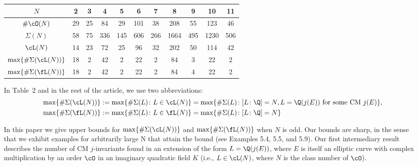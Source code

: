 	\begin{table}[!ht]
	\centering
	\begin{tabular}{c|cccccccccc}
	$N$ & 2 & 3 & 4 & 5 & 6 & 7 & 8 & 9 & 10 & 11 \\ \hline
	$\#\cO(N)$ & 29 & 25 & 84 & 29 & 101 & 38 & 208 & 55 & 123 & 46 \\ \hline
	$\Sigma(N)$ & 58 & 75 & 336 & 145 & 606 & 266 & 1664 & 495 & 1230 & 506 \\ \hline
	$\cL(N)$ & 14 & 23 & 72 & 25 & 96 & 32 & 202 & 50 & 114 & 42 \\ \hline
	$\max\{\#\Sigma(\cL(N))\}$ & 18 & 2 & 42 & 2 & 22 & 2 & 84 & 3 & 22 & 2 \\ \hline
	$\max\{\#\Sigma(\fL(N))\}$ & 18 & 2 & 42 & 2 & 22 & 2 & 84 & 4 & 22 & 2 
	\end{tabular}
	\end{table}


In Table~2 and in the rest of the article, we use two abbreviations:
	\[
	\begin{aligned}
	\max\{\#\Sigma(\cL(N))\}&:= \max\{\#\Sigma(L) \colon L \in \cL(N)\}= \max\{\#\Sigma(L) \colon [L \colon \Q]= N, L= \Q(j(E)) \text{ for some CM } j(E) \}, \\
	\max\{\#\Sigma(\fL(N))\}&:= \max\{\#\Sigma(L) \colon L \in \fL(N)\}= \max\{\#\Sigma(L) \colon [L \colon \Q]= N \}
	\end{aligned}
	\]


In this paper we give upper bounds for $\max\{\#\Sigma(\cL(N))\}$ and $\max\{\#\Sigma(\fL(N))\}$ when $N$ is odd. Our bounds are sharp, in the sense that we exhibit examples for arbitrarily large N that attain the bound (see Examples 5.4, 5.5, and 5.9). Our first intermediary result describes the number of CM $j$-invariants found in an extension of the form $L= \Q(j(E))$, where $E$ is itself an elliptic curve with complex multiplication by an order $\cO$ in an imaginary quadratic field $K$ (i.e., $L \in \cL(N)$, where $N$ is the class number of $\cO$).


